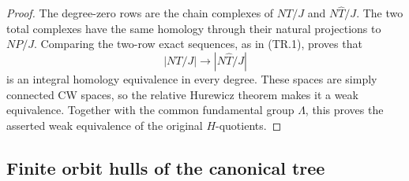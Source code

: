 \begin{proof}
The degree-zero rows are the chain complexes of $NT/J$ and
$N\widehat T/J$. The two total complexes have the same
homology through their natural projections to $NP/J$.
Comparing the two-row exact sequences, as in (TR.1), proves
that
\[
 |NT/J|\longrightarrow |N\widehat T/J|
\]
is an integral homology equivalence in every degree. These
spaces are simply connected CW spaces, so the relative
Hurewicz theorem makes it a weak equivalence. Together with
the common fundamental group $\Lambda$, this proves the
asserted weak equivalence of the original $H$-quotients.
\end{proof}


\subsection{Finite orbit hulls of the canonical tree}

